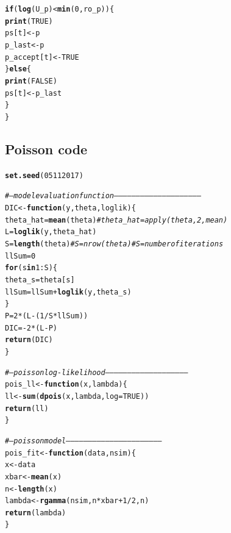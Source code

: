 \documentclass{article}\usepackage[]{graphicx}\usepackage[]{color}
\makeatletter
\newcommand{\hlnum}[1]{\textcolor[rgb]{0.686,0.059,0.569}{#1}}%
\newcommand{\hlcom}[1]{\textcolor[rgb]{0.678,0.584,0.686}{\textit{#1}}}%
\newcommand{\hlopt}[1]{\textcolor[rgb]{0,0,0}{#1}}%
\newcommand{\hlstd}[1]{\textcolor[rgb]{0.345,0.345,0.345}{#1}}%
\newcommand{\hlkwa}[1]{\textcolor[rgb]{0.161,0.373,0.58}{\textbf{#1}}}%
\newcommand{\hlkwb}[1]{\textcolor[rgb]{0.69,0.353,0.396}{#1}}%
\newcommand{\hlkwc}[1]{\textcolor[rgb]{0.333,0.667,0.333}{#1}}%
\newcommand{\hlkwd}[1]{\textcolor[rgb]{0.737,0.353,0.396}{\textbf{#1}}}%
\newenvironment{kframe}{%
 \def\at@end@of@kframe{}%
 \ifinner\ifhmode%
  \def\at@end@of@kframe{\end{minipage}}%
  \begin{minipage}{\columnwidth}%
 \fi\fi%
 \def\FrameCommand##1{\hskip\@totalleftmargin \hskip-\fboxsep
 \colorbox{shadecolor}{##1}\hskip-\fboxsep
     \hskip-\linewidth \hskip-\@totalleftmargin \hskip\columnwidth}%
 \MakeFramed {\advance\hsize-\width
   \@totalleftmargin\z@ \linewidth\hsize
   \@setminipage}}%
 {\par\unskip\endMakeFramed%
 \at@end@of@kframe}
\newenvironment{knitrout}{}{} %
\makeatother
\begin{document}
\begin{knitrout}
\begin{kframe}
\begin{alltt}
  \hlkwa{if}\hlstd{(}\hlkwd{log}\hlstd{(U_p)} \hlopt{<} \hlkwd{min}\hlstd{(}\hlnum{0}\hlstd{, ro_p))\{}
    \hlkwd{print}\hlstd{(}\hlnum{TRUE}\hlstd{)}
    \hlstd{ps[t]} \hlkwb{<-} \hlstd{p}
    \hlstd{p_last} \hlkwb{<-} \hlstd{p}
    \hlstd{p_accept[t]} \hlkwb{<-} \hlnum{TRUE}
  \hlstd{\}} \hlkwa{else}\hlstd{\{}
    \hlkwd{print}\hlstd{(}\hlnum{FALSE}\hlstd{)}
    \hlstd{ps[t]} \hlkwb{<-} \hlstd{p_last}
  \hlstd{\}}
\hlstd{\}}
\end{alltt}
\end{kframe}
\end{knitrout}
\subsection{Poisson code}
\begin{knitrout}
\color{fgcolor}\begin{kframe}
\begin{alltt}
\hlkwd{set.seed}\hlstd{(}\hlnum{05112017}\hlstd{)}

\hlcom{# --- model evaluation function -----------------------------------------------------------}
\hlstd{DIC} \hlkwb{<-} \hlkwa{function}\hlstd{(}\hlkwc{y}\hlstd{,} \hlkwc{theta}\hlstd{,} \hlkwc{loglik}\hlstd{) \{}
  \hlstd{theta_hat} \hlkwb{=} \hlkwd{mean}\hlstd{(theta)} \hlcom{#theta_hat = apply(theta, 2, mean)}
  \hlstd{L} \hlkwb{=} \hlkwd{loglik}\hlstd{(y, theta_hat)}
  \hlstd{S} \hlkwb{=} \hlkwd{length}\hlstd{(theta)} \hlcom{#S = nrow(theta) #S = number of iterations}
  \hlstd{llSum} \hlkwb{=} \hlnum{0}
  \hlkwa{for} \hlstd{(s} \hlkwa{in} \hlnum{1}\hlopt{:}\hlstd{S) \{}
    \hlstd{theta_s} \hlkwb{=} \hlstd{theta[s]}
    \hlstd{llSum} \hlkwb{=} \hlstd{llSum} \hlopt{+} \hlkwd{loglik}\hlstd{(y, theta_s)}
  \hlstd{\}}
  \hlstd{P} \hlkwb{=} \hlnum{2} \hlopt{*} \hlstd{(L} \hlopt{-} \hlstd{(}\hlnum{1} \hlopt{/} \hlstd{S} \hlopt{*} \hlstd{llSum))}
  \hlstd{DIC} \hlkwb{=} \hlopt{-} \hlnum{2} \hlopt{*} \hlstd{(L} \hlopt{-} \hlstd{P)}
  \hlkwd{return}\hlstd{(DIC)}
\hlstd{\}}

\hlcom{# --- poisson log-likelihood ---------------------------------------------------------}
\hlstd{pois_ll} \hlkwb{<-} \hlkwa{function}\hlstd{(}\hlkwc{x}\hlstd{,} \hlkwc{lambda}\hlstd{) \{}
  \hlstd{ll} \hlkwb{<-} \hlkwd{sum}\hlstd{(}\hlkwd{dpois}\hlstd{(x, lambda,} \hlkwc{log} \hlstd{=} \hlnum{TRUE}\hlstd{))}
  \hlkwd{return}\hlstd{(ll)}
\hlstd{\}}

\hlcom{# --- poisson model -----------------------------------------------------------------}
\hlstd{pois_fit} \hlkwb{<-} \hlkwa{function}\hlstd{(}\hlkwc{data}\hlstd{,} \hlkwc{nsim}\hlstd{) \{}
  \hlstd{x} \hlkwb{<-} \hlstd{data}
  \hlstd{xbar} \hlkwb{<-} \hlkwd{mean}\hlstd{(x)}
  \hlstd{n} \hlkwb{<-} \hlkwd{length}\hlstd{(x)}
  \hlstd{lambda} \hlkwb{<-} \hlkwd{rgamma}\hlstd{(nsim, n} \hlopt{*} \hlstd{xbar} \hlopt{+} \hlnum{1} \hlopt{/}\hlnum{2}\hlstd{, n)}
  \hlkwd{return}\hlstd{(lambda)}
\hlstd{\}}


\end{alltt}
\end{kframe}
\end{knitrout}
\end{document}
